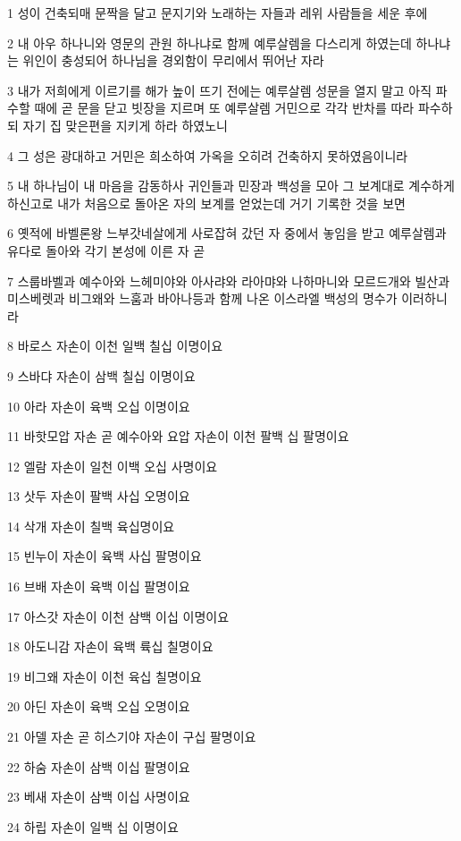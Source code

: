 \par 1 성이 건축되매 문짝을 달고 문지기와 노래하는 자들과 레위 사람들을 세운 후에
\par 2 내 아우 하나니와 영문의 관원 하나냐로 함께 예루살렘을 다스리게 하였는데 하나냐는 위인이 충성되어 하나님을 경외함이 무리에서 뛰어난 자라
\par 3 내가 저희에게 이르기를 해가 높이 뜨기 전에는 예루살렘 성문을 열지 말고 아직 파수할 때에 곧 문을 닫고 빗장을 지르며 또 예루살렘 거민으로 각각 반차를 따라 파수하되 자기 집 맞은편을 지키게 하라 하였노니
\par 4 그 성은 광대하고 거민은 희소하여 가옥을 오히려 건축하지 못하였음이니라
\par 5 내 하나님이 내 마음을 감동하사 귀인들과 민장과 백성을 모아 그 보계대로 계수하게 하신고로 내가 처음으로 돌아온 자의 보계를 얻었는데 거기 기록한 것을 보면
\par 6 옛적에 바벨론왕 느부갓네살에게 사로잡혀 갔던 자 중에서 놓임을 받고 예루살렘과 유다로 돌아와 각기 본성에 이른 자 곧
\par 7 스룹바벨과 예수아와 느헤미야와 아사랴와 라아먀와 나하마니와 모르드개와 빌산과 미스베렛과 비그왜와 느훔과 바아나등과 함께 나온 이스라엘 백성의 명수가 이러하니라
\par 8 바로스 자손이 이천 일백 칠십 이명이요
\par 9 스바댜 자손이 삼백 칠십 이명이요
\par 10 아라 자손이 육백 오십 이명이요
\par 11 바핫모압 자손 곧 예수아와 요압 자손이 이천 팔백 십 팔명이요
\par 12 엘람 자손이 일천 이백 오십 사명이요
\par 13 삿두 자손이 팔백 사십 오명이요
\par 14 삭개 자손이 칠백 육십명이요
\par 15 빈누이 자손이 육백 사십 팔명이요
\par 16 브배 자손이 육백 이십 팔명이요
\par 17 아스갓 자손이 이천 삼백 이십 이명이요
\par 18 아도니감 자손이 육백 륙십 칠명이요
\par 19 비그왜 자손이 이천 육십 칠명이요
\par 20 아딘 자손이 육백 오십 오명이요
\par 21 아델 자손 곧 히스기야 자손이 구십 팔명이요
\par 22 하숨 자손이 삼백 이십 팔명이요
\par 23 베새 자손이 삼백 이십 사명이요
\par 24 하립 자손이 일백 십 이명이요
